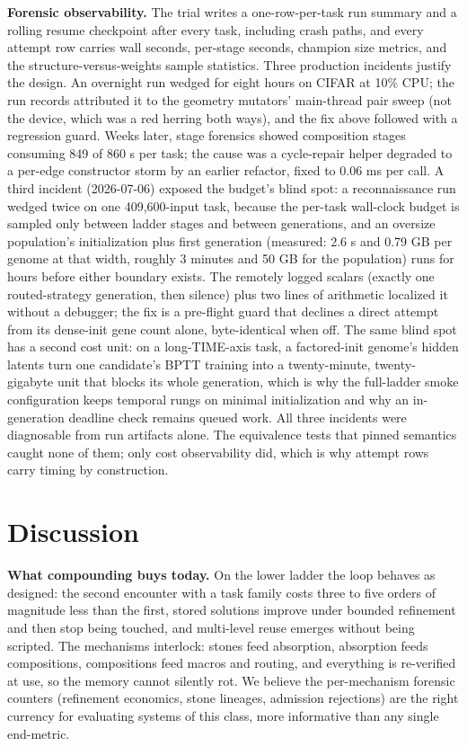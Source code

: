 \documentclass[11pt]{article}
\begin{document}
\textbf{Forensic observability.} The trial writes a one-row-per-task run summary and a rolling resume checkpoint after every task, including crash paths, and every attempt row carries wall seconds, per-stage seconds, champion size metrics, and the structure-versus-weights sample statistics. Three production incidents justify the design. An overnight run wedged for eight hours on CIFAR at 10\% CPU; the run records attributed it to the geometry mutators' main-thread pair sweep (not the device, which was a red herring both ways), and the fix above followed with a regression guard. Weeks later, stage forensics showed composition stages consuming 849 of 860 s per task; the cause was a cycle-repair helper degraded to a per-edge constructor storm by an earlier refactor, fixed to 0.06 ms per call. A third incident (2026-07-06) exposed the budget's blind spot: a reconnaissance run wedged twice on one 409,600-input task, because the per-task wall-clock budget is sampled only between ladder stages and between generations, and an oversize population's initialization plus first generation (measured: 2.6 s and 0.79 GB per genome at that width, roughly 3 minutes and 50 GB for the population) runs for hours before either boundary exists. The remotely logged scalars (exactly one routed-strategy generation, then silence) plus two lines of arithmetic localized it without a debugger; the fix is a pre-flight guard that declines a direct attempt from its dense-init gene count alone, byte-identical when off. The same blind spot has a second cost unit: on a long-TIME-axis task, a factored-init genome's hidden latents turn one candidate's BPTT training into a twenty-minute, twenty-gigabyte unit that blocks its whole generation, which is why the full-ladder smoke configuration keeps temporal rungs on minimal initialization and why an in-generation deadline check remains queued work. All three incidents were diagnosable from run artifacts alone. The equivalence tests that pinned semantics caught none of them; only cost observability did, which is why attempt rows carry timing by construction.

\section{Discussion}

\textbf{What compounding buys today.} On the lower ladder the loop behaves as designed: the second encounter with a task family costs three to five orders of magnitude less than the first, stored solutions improve under bounded refinement and then stop being touched, and multi-level reuse emerges without being scripted. The mechanisms interlock: stones feed absorption, absorption feeds compositions, compositions feed macros and routing, and everything is re-verified at use, so the memory cannot silently rot. We believe the per-mechanism forensic counters (refinement economics, stone lineages, admission rejections) are the right currency for evaluating systems of this class, more informative than any single end-metric.
\end{document}
